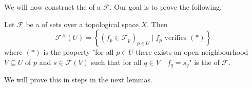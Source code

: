 \documentclass[../main.tex]{subfiles}
\begin{document}
We will now construct the  of a  \(\mathcal{F}\).
Our goal is to prove the following.
\begin{theorem}\label{thm:sheafification-construction}
  Let \(\mathcal{F}\) be a  of sets over a topological space \(X\). Then
  \begin{equation} \label{eq:f-sharp}
    \mathcal{F}^{\#}(U) = \left\{ (f_{p} \in \mathcal{F}_{p})_{p \in U} \mid f_{p} \text{ verifies } (\ast) \right\}
  \end{equation}
  where \((\ast)\) is the property "for all \(p \in U\) there exists an open neighbourhood \(V \subseteq U\) of \(p\) and \(s \in \mathcal{F}(V)\) such that for all \(q \in V \quad f_{q} = s_{q}\)" is the  of \(\mathcal{F}\).
\end{theorem}

We will prove this in steps in the next lemmas.
\end{document}
